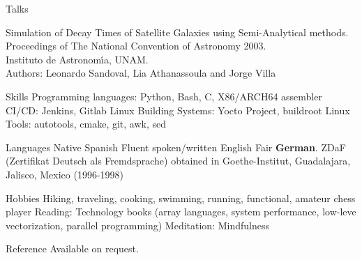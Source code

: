\documentclass{resume}
\begin{document}

\begin{category}{Talks}

\citembullet Simulation of Decay Times of Satellite Galaxies using Semi-Analytical methods.\\
Proceedings of The National Convention of Astronomy 2003.\\
Instituto de Astronom\'{\i}a, UNAM. \\
Authors: Leonardo Sandoval, Lia Athanassoula and Jorge Villa
\end{category}

\begin{category}{Skills}
  \citembullet Programming languages: Python, Bash, C, X86/ARCH64 assembler
  \citembullet CI/CD: Jenkins, Gitlab
  \citembullet Linux Building Systems: Yocto Project, buildroot
  \citembullet Linux Tools: autotools, cmake, git, awk, sed
\end{category}

\begin{category}{Languages}
  \citembullet Native Spanish
  \citembullet Fluent spoken/written English
  \citembullet Fair \textbf{German}. ZDaF (Zertifikat Deutsch als Fremdsprache) obtained in Goethe-Institut, Guadalajara, Jalisco, Mexico (1996-1998)
\end{category}

\begin{category}{Hobbies}
  \citembullet Hiking, traveling, cooking, swimming, running, functional, amateur chess player
  \citembullet Reading: Technology books (array languages, system performance, low-leve vectorization, parallel programming)
  \citembullet Meditation: Mindfulness
\end{category}

\begin{category}{Reference} 
  \citemnobullet Available on request.
\end{category}
\end{document}
